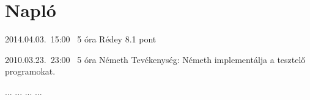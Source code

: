 %
\section{Napló}

\begin{naplo}

\bejegyzes
{2014.04.03.~15:00~} %
{5 óra} %
{Rédey} %
{8.1 pont} %

\bejegyzes
{2010.03.23.~23:00~}
{5 óra}
{Németh}
{Tevékenység: Németh implementálja a tesztelő programokat.}

\bejegyzes
{...}
{...}
{...}
{...}


\end{naplo}

